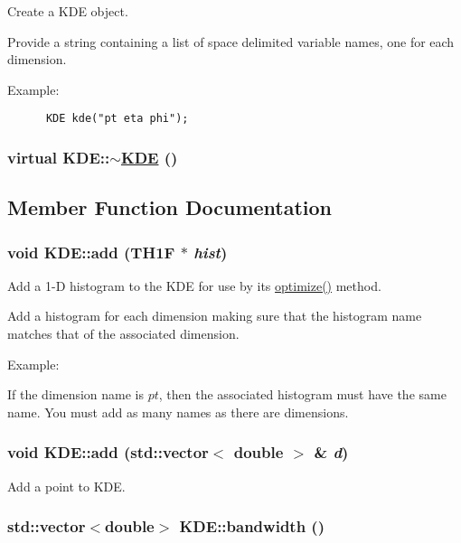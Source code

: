 Create a KDE object. 

Provide a string containing a list of space delimited variable names, one for each dimension. 

Example: 

\footnotesize\begin{verbatim}      KDE kde("pt eta phi");
\end{verbatim}
\normalsize
\hypertarget{classKDE_a2}{
\subsubsection[$\sim$KDE]{\setlength{\rightskip}{0pt plus 5cm}virtual KDE::$\sim$\hyperlink{classKDE}{KDE} ()}}
\label{classKDE_a2}




\subsection{Member Function Documentation}
\hypertarget{classKDE_a5}{
\subsubsection[add]{\setlength{\rightskip}{0pt plus 5cm}void KDE::add (TH1F $\ast$ {\em hist})}}
\label{classKDE_a5}


Add a 1-D histogram to the KDE for use by its \hyperlink{classKDE_a7}{optimize()} method. 

Add a histogram for each dimension making sure that the histogram name matches that of the associated dimension. 

Example:\par
 If the dimension name is $pt$, then the associated histogram must have the same name. You must add as many names as there are dimensions. \hypertarget{classKDE_a4}{
\subsubsection[add]{\setlength{\rightskip}{0pt plus 5cm}void KDE::add (std::vector$<$ double $>$ \& {\em d})}}
\label{classKDE_a4}


Add a point to KDE. 

\hypertarget{classKDE_a12}{
\subsubsection[bandwidth]{\setlength{\rightskip}{0pt plus 5cm}std::vector$<$double$>$ KDE::bandwidth ()}}
\label{classKDE_a12}


